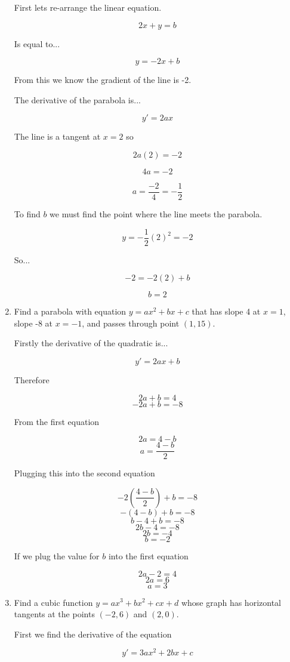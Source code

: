 \documentclass{article}
\begin{document}
\begin{enumerate}
				First lets re-arrange the linear equation.

				$$2x + y = b$$

				Is equal to...

				$$y = -2x + b$$

				From this we know the gradient of the line is -2.

				The derivative of the parabola is...

				$$y' = 2ax$$

				The line is a tangent at $x = 2$ so

				$$2a(2) = -2$$

				$$4a = -2$$

				$$a = \frac{-2}{4} = -\frac{1}{2}$$

				To find $b$ we must find the point where the line meets the
				parabola.

				$$y = -\frac{1}{2}(2)^2 = -2$$

				So...

				$$-2 = -2(2) + b$$

				$$b = 2$$

			\item Find a parabola with equation $y = ax^2 + bx + c$ that has slope 4
				at $x = 1$, slope -8 at $x = -1$, and passes through point $(1,15)$.

				Firstly the derivative of the quadratic is...

				$$y' = 2ax + b$$

				Therefore

				$$2a + b = 4$$
				$$-2a + b = -8$$

				From the first equation

				$$2a = 4 - b$$
				$$a = \frac{4-b}{2}$$

				Plugging this into the second equation

				$$-2(\frac{4-b}{2}) + b = -8$$
				$$-(4-b) + b = -8$$
				$$b-4+b = -8$$
				$$2b - 4 = - 8$$
				$$2b = -4$$
				$$b = -2$$

				If we plug the value for $b$ into the first equation

				$$2a -2 = 4$$
				$$2a = 6$$
				$$a = 3$$

			\item Find a cubic function $y = ax^3 + bx^2 + cx + d$ whose graph has horizontal
				tangents at the points $(-2,6)$ and $(2,0)$.

				First we find the derivative of the equation

				$$y' = 3ax^2 + 2bx + c$$


\end{enumerate}
\end{document}

